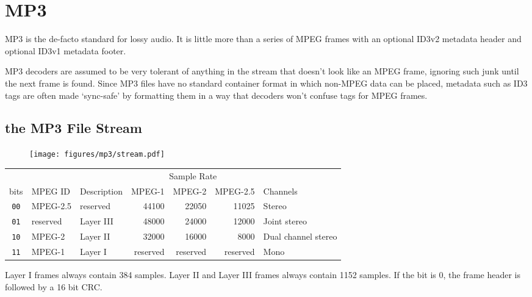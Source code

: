 
\chapter{MP3}
MP3 is the de-facto standard for lossy audio.
It is little more than a series of MPEG frames with an
optional ID3v2 metadata header and optional ID3v1 metadata
footer.

MP3 decoders are assumed to be very tolerant of anything in
the stream that doesn't look like an MPEG frame, ignoring such
junk until the next frame is found.
Since MP3 files have no standard container format in which
non-MPEG data can be placed, metadata such as ID3 tags are often
made `sync-safe' by formatting them in a way that decoders won't
confuse tags for MPEG frames.
\section{the MP3 File Stream}
\begin{figure}[h]
\texttt{[image: figures/mp3/stream.pdf]}
\end{figure}
\begin{table}[h]
\begin{tabular}{|c||l||l||r|r|r||l|}
\hline
& & & \multicolumn{3}{c||}{Sample Rate} & \\
bits & MPEG ID & Description & MPEG-1 & MPEG-2 & MPEG-2.5 & Channels \\
\hline
\texttt{00} & MPEG-2.5 & reserved & 44100 & 22050 & 11025 & Stereo \\
\texttt{01} & reserved & Layer III & 48000 & 24000 & 12000 & Joint stereo \\
\texttt{10} & MPEG-2 & Layer II & 32000 & 16000 & 8000 & Dual channel stereo\\
\texttt{11} & MPEG-1 & Layer I & reserved & reserved & reserved & Mono \\
\hline
\end{tabular}
\end{table}
\par
\noindent
Layer I frames always contain 384 samples.
Layer II and Layer III frames always contain 1152 samples.
If the  bit is 0, the frame header is followed by a
16 bit CRC.

